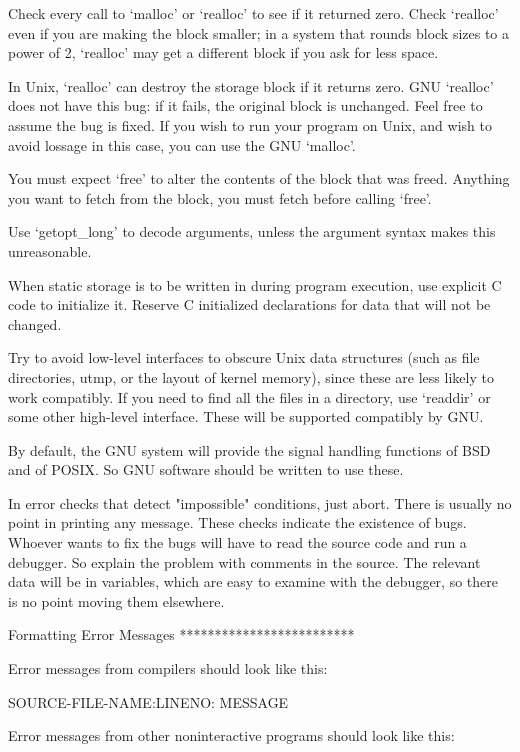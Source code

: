    Check every call to `malloc' or `realloc' to see if it returned
zero.  Check `realloc' even if you are making the block smaller; in a
system that rounds block sizes to a power of 2, `realloc' may get a
different block if you ask for less space.

   In Unix, `realloc' can destroy the storage block if it returns zero.
GNU `realloc' does not have this bug: if it fails, the original block
is unchanged.  Feel free to assume the bug is fixed.  If you wish to
run your program on Unix, and wish to avoid lossage in this case, you
can use the GNU `malloc'.

   You must expect `free' to alter the contents of the block that was
freed.  Anything you want to fetch from the block, you must fetch before
calling `free'.

   Use `getopt_long' to decode arguments, unless the argument syntax
makes this unreasonable.

   When static storage is to be written in during program execution, use
explicit C code to initialize it.  Reserve C initialized declarations
for data that will not be changed.

   Try to avoid low-level interfaces to obscure Unix data structures
(such as file directories, utmp, or the layout of kernel memory), since
these are less likely to work compatibly.  If you need to find all the
files in a directory, use `readdir' or some other high-level interface.
These will be supported compatibly by GNU.

   By default, the GNU system will provide the signal handling
functions of BSD and of POSIX.  So GNU software should be written to use
these.

   In error checks that detect "impossible" conditions, just abort.
There is usually no point in printing any message.  These checks
indicate the existence of bugs.  Whoever wants to fix the bugs will have
to read the source code and run a debugger.  So explain the problem with
comments in the source.  The relevant data will be in variables, which
are easy to examine with the debugger, so there is no point moving them
elsewhere.

Formatting Error Messages
*************************

   Error messages from compilers should look like this:

     SOURCE-FILE-NAME:LINENO: MESSAGE

   Error messages from other noninteractive programs should look like
this:

